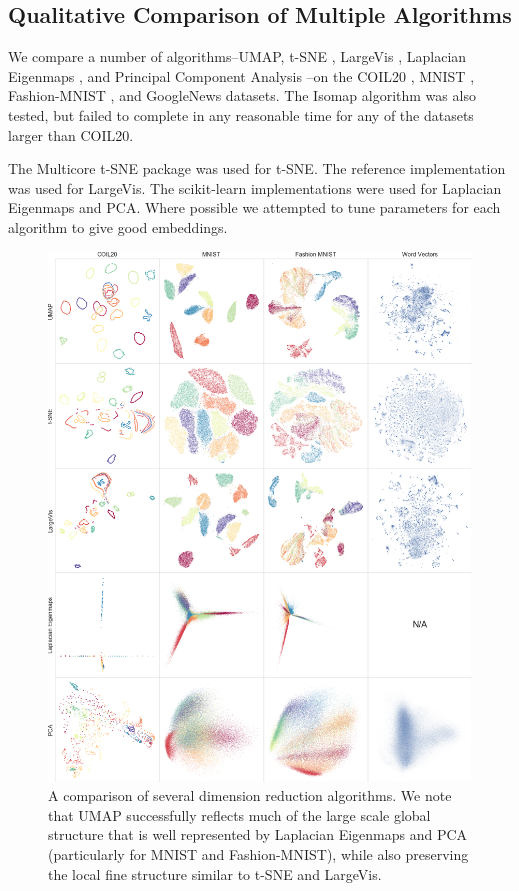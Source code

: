\documentclass[12pt]{article}
\begin{document}
\subsection{Qualitative Comparison of Multiple Algorithms}\label{subsec:qual-comparison}

We compare a number of algorithms--UMAP, t-SNE \cite{vanDerMaaten2008,van2014accelerating}, LargeVis \cite{tang2016visualizing}, Laplacian Eigenmaps \cite{belkin2003laplacian}, and Principal Component Analysis \cite{hotelling1933analysis}--on the COIL20 \cite{COIL20}, MNIST \cite{mnistlecun}, Fashion-MNIST \cite{xiao2017}, and GoogleNews \cite{mikolov2013distributed} datasets. The Isomap algorithm was also tested, but failed to complete in any reasonable time for any of the datasets larger than COIL20.

The Multicore t-SNE package \cite{Ulyanov2016} was used for t-SNE. The reference implementation \cite{LFerry2016} was used for LargeVis. The scikit-learn \cite{sklearn_api} implementations were used for Laplacian Eigenmaps and PCA. Where possible we attempted to tune parameters for each algorithm to give good embeddings. 

\begin{figure}
    \centering
    \includegraphics[width=\textwidth]{dim-red-comparison-nips.png}
    \caption{A comparison of several dimension reduction algorithms. We note that UMAP successfully reflects much of the large scale global structure that is well represented by Laplacian Eigenmaps and PCA (particularly for MNIST and Fashion-MNIST), while also preserving the local fine structure similar to t-SNE and LargeVis.}
    \label{fig:comparison}
\end{figure}
\end{document}
